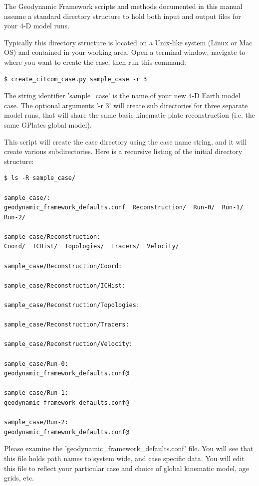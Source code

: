 \documentclass[letterpaper,12pt]{article}
\begin{document}
The Geodynamic Framework scripts and methods documented in this manual assume a standard directory structure 
to hold both input and output files for your 4-D model runs.  

Typically this directory structure is located on a Unix-like system (Linux or Mac OS) and contained in your working area.  
Open a terminal window, navigate to where you want to create the case, then run this command:

\begin{verbatim}
$ create_citcom_case.py sample_case -r 3
\end{verbatim}

The string identifier 'sample\_case' is the name of your new 4-D Earth model case.  
The optional arguments '-r 3' will create sub directories for three separate model runs,
that will share the same basic kinematic plate reconstruction (i.e. the same GPlates global model).

This script will create the case directory using the case name string, and it will create various subdirectories.
Here is a recursive listing of the initial directory structure:

\begin{verbatim}
$ ls -R sample_case/

sample_case/:
geodynamic_framework_defaults.conf  Reconstruction/  Run-0/  Run-1/  Run-2/

sample_case/Reconstruction:
Coord/  ICHist/  Topologies/  Tracers/  Velocity/

sample_case/Reconstruction/Coord:

sample_case/Reconstruction/ICHist:

sample_case/Reconstruction/Topologies:

sample_case/Reconstruction/Tracers:

sample_case/Reconstruction/Velocity:

sample_case/Run-0:
geodynamic_framework_defaults.conf@

sample_case/Run-1:
geodynamic_framework_defaults.conf@

sample_case/Run-2:
geodynamic_framework_defaults.conf@
\end{verbatim}

Please examine the 'geodynamic\_framework\_defaults.conf' file.
You will see that this file holds path names to system wide, and case specific data.  
You will edit this file to reflect your particular case and choice of global kinematic model, age grids, etc.
\end{document}
